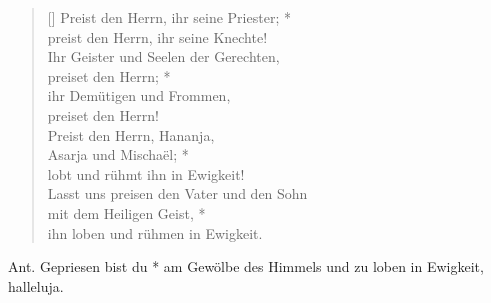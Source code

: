 \begin{verse}[\versewidth]
\vin Preist den Herrn, ihr seine Priester; *\\
\vin preist den Herrn, ihr seine Knechte!\\
Ihr Geister und Seelen der Gerechten,\\
preiset den Herrn; *\\
ihr Demütigen und Frommen,\\
preiset den Herrn!\\
\vin Preist den Herrn, Hananja,\\
\vin Asarja und Mischaël; *\\
\vin lobt und rühmt ihn in Ewigkeit!\\
Lasst uns preisen den Vater und den Sohn\\
mit dem Heiligen Geist, *\\
ihn loben und rühmen in Ewigkeit.\\ 

\end{verse}


\medskip

{}


\medskip

\def\greinitialformat#1{{\fontsize{40}{40}\selectfont #1}}
\gresetfirstlineaboveinitial{\footnotesize \textcolor{red}{Dan 3,52-57}}{}
\setaboveinitialseparation{0.72mm}

\smallskip

\begin{sloppypar}
{\noindent\rm{Ant. Gepriesen bist du * am Gewölbe des Himmels und zu loben in Ewigkeit, halleluja.}}
\end{sloppypar}

\medskip






